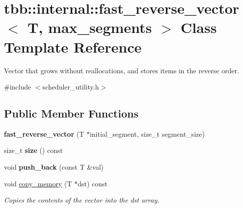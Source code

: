 \hypertarget{classtbb_1_1internal_1_1fast__reverse__vector}{}\section{tbb\+:\+:internal\+:\+:fast\+\_\+reverse\+\_\+vector$<$ T, max\+\_\+segments $>$ Class Template Reference}
\label{classtbb_1_1internal_1_1fast__reverse__vector}


Vector that grows without reallocations, and stores items in the reverse order.  




{\ttfamily \#include $<$scheduler\+\_\+utility.\+h$>$}

\subsection*{Public Member Functions}
\begin{DoxyCompactItemize}
\item 
\hypertarget{classtbb_1_1internal_1_1fast__reverse__vector_a4276f414f22746ffb4178fefd0537cfa}{}{\bfseries fast\+\_\+reverse\+\_\+vector} (T $\ast$initial\+\_\+segment, size\+\_\+t segment\+\_\+size)\label{classtbb_1_1internal_1_1fast__reverse__vector_a4276f414f22746ffb4178fefd0537cfa}

\item 
\hypertarget{classtbb_1_1internal_1_1fast__reverse__vector_aa8613832b1bd5dab7186d19ad6d6e751}{}size\+\_\+t {\bfseries size} () const \label{classtbb_1_1internal_1_1fast__reverse__vector_aa8613832b1bd5dab7186d19ad6d6e751}

\item 
\hypertarget{classtbb_1_1internal_1_1fast__reverse__vector_ae533cd1ab5be44deaa0ee7ad7ece6f4b}{}void {\bfseries push\+\_\+back} (const T \&val)\label{classtbb_1_1internal_1_1fast__reverse__vector_ae533cd1ab5be44deaa0ee7ad7ece6f4b}

\item 
void \hyperlink{classtbb_1_1internal_1_1fast__reverse__vector_a48d1c96d94c3dad0c130eaab3ac80049}{copy\+\_\+memory} (T $\ast$dst) const 
\begin{DoxyCompactList}\small\item\em Copies the contents of the vector into the dst array. \end{DoxyCompactList}\end{DoxyCompactItemize}
